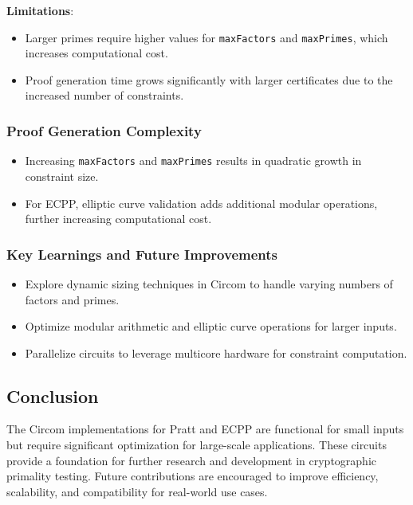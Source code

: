 \documentclass[12pt]{article}
\begin{document}
\textbf{Limitations}:
\begin{itemize}
    \item Larger primes require higher values for \texttt{maxFactors} and \texttt{maxPrimes}, which increases computational cost.
    \item Proof generation time grows significantly with larger certificates due to the increased number of constraints.
\end{itemize}

\subsubsection*{Proof Generation Complexity}
\begin{itemize}
    \item Increasing \texttt{maxFactors} and \texttt{maxPrimes} results in quadratic growth in constraint size.
    \item For ECPP, elliptic curve validation adds additional modular operations, further increasing computational cost.
\end{itemize}

\subsubsection*{Key Learnings and Future Improvements}
\begin{itemize}
    \item Explore dynamic sizing techniques in Circom to handle varying numbers of factors and primes.
    \item Optimize modular arithmetic and elliptic curve operations for larger inputs.
    \item Parallelize circuits to leverage multicore hardware for constraint computation.
\end{itemize}

\subsection*{Conclusion}

The Circom implementations for Pratt and ECPP are functional for small inputs but require significant optimization for large-scale applications. These circuits provide a foundation for further research and development in cryptographic primality testing. Future contributions are encouraged to improve efficiency, scalability, and compatibility for real-world use cases.
\end{document}
